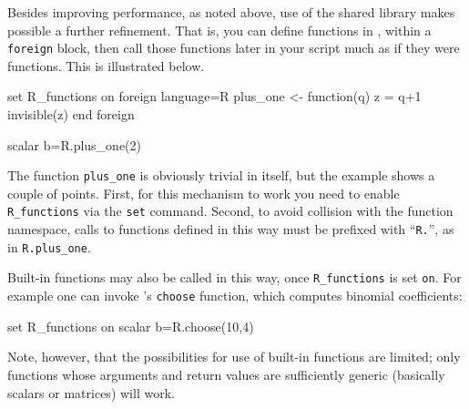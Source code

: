 Besides improving performance, as noted above, use of the 
shared library makes possible a further refinement.  That is, you can
define functions in , within a \texttt{foreign} block, then
call those functions later in your script much as if they were
 functions.  This is illustrated below.  
%
\begin{code}
set R_functions on
foreign language=R
  plus_one <- function(q) {
     z = q+1
     invisible(z)
  }
end foreign

scalar b=R.plus_one(2)
\end{code}
%
The  function \verb|plus_one| is obviously trivial in itself,
but the example shows a couple of points.  First, for this mechanism
to work you need to enable \verb|R_functions| via the \texttt{set}
command.  Second, to avoid collision with the  function
namespace, calls to functions defined in this way must be prefixed
with ``\texttt{R.}'', as in \verb|R.plus_one|.

Built-in  functions may also be called in this way, once
\verb|R_functions| is set \texttt{on}.  For example one can invoke
's \texttt{choose} function, which computes binomial
coefficients:
%
\begin{code}
set R_functions on
scalar b=R.choose(10,4)
\end{code}
%
Note, however, that the possibilities for use of built-in 
functions are limited; only functions whose arguments and return
values are sufficiently generic (basically scalars or matrices) will
work.


